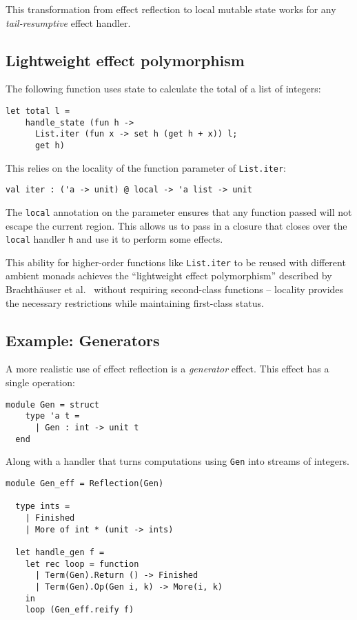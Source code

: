 \documentclass[acmsmall, screen, review, anonymous]{acmart}
\theoremstyle{definition}
\begin{document}
This transformation from effect reflection to local mutable state works
for any \emph{tail-resumptive} effect handler.

\subsection{Lightweight effect polymorphism}

The following function uses state to calculate the total of a list of
integers:
\begin{lstlisting}[style=oxcaml]
  let total l =
    handle_state (fun h ->
      List.iter (fun x -> set h (get h + x)) l;
      get h)
\end{lstlisting}
This relies on the locality of the function parameter of
\lstinline[style=oxcaml]{List.iter}:
\begin{lstlisting}[style=oxcaml]
  val iter : ('a -> unit) @ local -> 'a list -> unit
\end{lstlisting}
The \lstinline[style=oxcaml]{local} annotation on the parameter ensures
that any function passed will not escape the current region. This allows
us to pass in a closure that closes over the
\lstinline[style=oxcaml]{local} handler \lstinline[style=oxcaml]{h} and
use it to perform some effects.

This ability for higher-order functions like
\lstinline[style=oxcaml]{List.iter} to be reused with different ambient
monads achieves the ``lightweight effect polymorphism'' described by
Brachth{\"a}user et al.~\cite{brachthauser2020effects} without requiring
second-class functions -- locality provides the necessary restrictions
while maintaining first-class status.

\subsection{Example: Generators}

A more realistic use of effect reflection is a \emph{generator}
effect. This effect has a single operation:
\begin{lstlisting}[style=oxcaml]
  module Gen = struct
    type 'a t =
      | Gen : int -> unit t
  end
\end{lstlisting}
Along with a handler that turns computations using
\lstinline[style=oxcaml]{Gen} into streams of integers.
\begin{lstlisting}[style=oxcaml]
  module Gen_eff = Reflection(Gen)

  type ints =
    | Finished
    | More of int * (unit -> ints)

  let handle_gen f =
    let rec loop = function
      | Term(Gen).Return () -> Finished
      | Term(Gen).Op(Gen i, k) -> More(i, k)
    in
    loop (Gen_eff.reify f)
\end{lstlisting}
\end{document}
